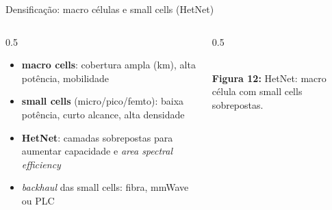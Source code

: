 \documentclass[aspectratio=169,11pt]{beamer}
\begin{document}
\begin{frame}{Densificação: macro células e small cells (HetNet)}
  \begin{columns}
    \begin{column}{0.5\textwidth}
      \begin{itemize}
        \item \textbf{macro cells}: cobertura ampla (km), alta potência, mobilidade
        \item \textbf{small cells} (micro/pico/femto): baixa potência, curto alcance, alta densidade
        \item \textbf{HetNet}: camadas sobrepostas para aumentar capacidade e \emph{area spectral efficiency}
        \item \emph{backhaul} das small cells: fibra, mmWave ou PLC
      \end{itemize}
    \end{column}
    \begin{column}{0.5\textwidth}
      \begin{center}
        \\[1mm]
        {\scriptsize \textbf{Figura 12:} HetNet: macro célula com small cells sobrepostas.}
      \end{center}
    \end{column}
  \end{columns}
\end{frame}
\end{document}
